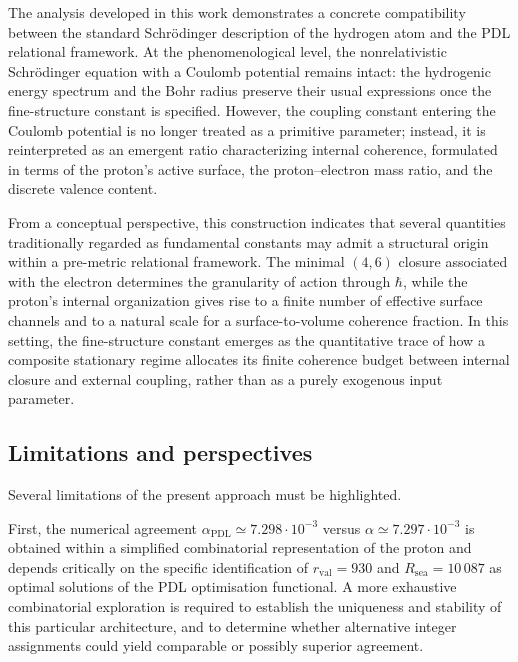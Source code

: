 \documentclass[12pt,a4paper]{article}
\begin{document}
The analysis developed in this work demonstrates a concrete compatibility between the standard Schr\"odinger description of the hydrogen atom and the PDL relational framework. At the phenomenological level, the nonrelativistic Schr\"odinger equation with a Coulomb potential remains intact: the hydrogenic energy spectrum and the Bohr radius preserve their usual expressions once the fine-structure constant is specified. However, the coupling constant entering the Coulomb potential is no longer treated as a primitive parameter; instead, it is reinterpreted as an emergent ratio characterizing internal coherence, formulated in terms of the proton’s active surface, the proton–electron mass ratio, and the discrete valence content.\cite{Laubscher2026PDL_English,Laubscher2026LDP_French}

From a conceptual perspective, this construction indicates that several quantities traditionally regarded as fundamental constants may admit a structural origin within a pre-metric relational framework. The minimal \((4,6)\) closure associated with the electron determines the granularity of action through \(\hbar\), while the proton’s internal organization gives rise to a finite number of effective surface channels and to a natural scale for a surface-to-volume coherence fraction. In this setting, the fine-structure constant emerges as the quantitative trace of how a composite stationary regime allocates its finite coherence budget between internal closure and external coupling, rather than as a purely exogenous input parameter.\cite{Laubscher2026IntroPDL,Laubscher2026PDL_English}

\subsection{Limitations and perspectives}

Several limitations of the present approach must be highlighted.

First, the numerical agreement \(\alpha_{\text{PDL}}\simeq 7.298 \cdot 10^{-3}\) versus \(\alpha \simeq 7.297 \cdot 10^{-3}\) is obtained within a simplified combinatorial representation of the proton and depends critically on the specific identification of \(r_{\text{val}}=930\) and \(R_{\text{sea}}=10\,087\) as optimal solutions of the PDL optimisation functional. A more exhaustive combinatorial exploration is required to establish the uniqueness and stability of this particular architecture, and to determine whether alternative integer assignments could yield comparable or possibly superior agreement.\cite{Laubscher2026PDL_English,Laubscher2026LDP_French}
\end{document}
